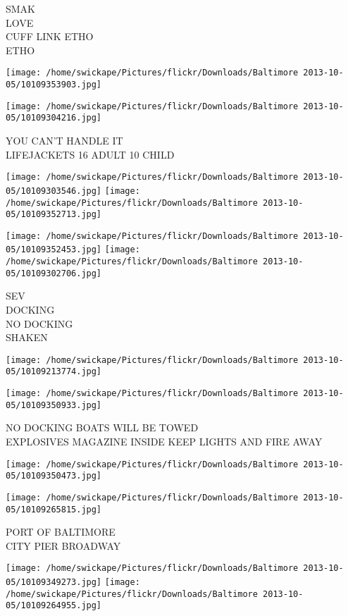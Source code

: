 \documentclass[10pt,letterpaper]{article}
\begin{document}
SMAK\\
LOVE\\
CUFF LINK ETHO\\
ETHO
\pagebreak

\texttt{[image: /home/swickape/Pictures/flickr/Downloads/Baltimore 2013-10-05/10109353903.jpg]}

\vspace{0.25in}
\texttt{[image: /home/swickape/Pictures/flickr/Downloads/Baltimore 2013-10-05/10109304216.jpg]}

YOU CAN'T HANDLE IT\\
LIFEJACKETS 16 ADULT 10 CHILD
\pagebreak

\texttt{[image: /home/swickape/Pictures/flickr/Downloads/Baltimore 2013-10-05/10109303546.jpg]}
\texttt{[image: /home/swickape/Pictures/flickr/Downloads/Baltimore 2013-10-05/10109352713.jpg]}

\texttt{[image: /home/swickape/Pictures/flickr/Downloads/Baltimore 2013-10-05/10109352453.jpg]}
\texttt{[image: /home/swickape/Pictures/flickr/Downloads/Baltimore 2013-10-05/10109302706.jpg]}

SEV\\
DOCKING\\
NO DOCKING\\
SHAKEN
\pagebreak

\texttt{[image: /home/swickape/Pictures/flickr/Downloads/Baltimore 2013-10-05/10109213774.jpg]}

\vspace{0.25in}
\texttt{[image: /home/swickape/Pictures/flickr/Downloads/Baltimore 2013-10-05/10109350933.jpg]}

NO DOCKING BOATS WILL BE TOWED\\
EXPLOSIVES MAGAZINE INSIDE KEEP LIGHTS AND FIRE AWAY
\pagebreak

\texttt{[image: /home/swickape/Pictures/flickr/Downloads/Baltimore 2013-10-05/10109350473.jpg]}

\vspace{0.25in}
\texttt{[image: /home/swickape/Pictures/flickr/Downloads/Baltimore 2013-10-05/10109265815.jpg]}

PORT OF BALTIMORE\\
CITY PIER BROADWAY
\pagebreak

\texttt{[image: /home/swickape/Pictures/flickr/Downloads/Baltimore 2013-10-05/10109349273.jpg]}
\texttt{[image: /home/swickape/Pictures/flickr/Downloads/Baltimore 2013-10-05/10109264955.jpg]}
\end{document}
